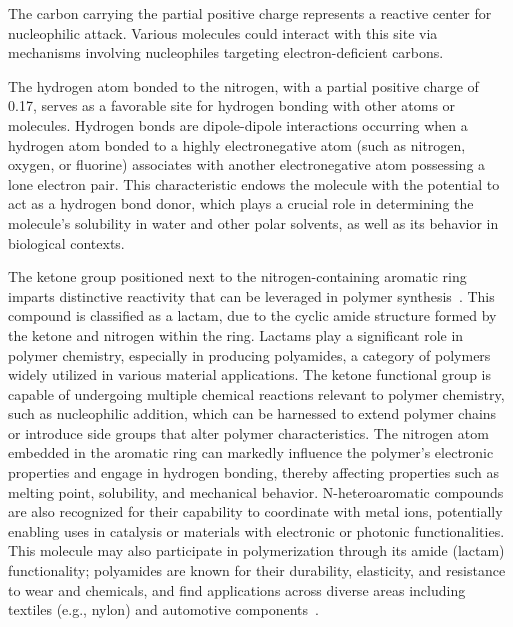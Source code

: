 The carbon carrying the partial positive charge represents a reactive center for nucleophilic attack. Various molecules could interact with this site via mechanisms involving nucleophiles targeting electron-deficient carbons.

The hydrogen atom bonded to the nitrogen, with a partial positive charge of 0.17, serves as a favorable site for hydrogen bonding with other atoms or molecules. Hydrogen bonds are dipole-dipole interactions occurring when a hydrogen atom bonded to a highly electronegative atom (such as nitrogen, oxygen, or fluorine) associates with another electronegative atom possessing a lone electron pair. This characteristic endows the molecule with the potential to act as a hydrogen bond donor, which plays a crucial role in determining the molecule’s solubility in water and other polar solvents, as well as its behavior in biological contexts.

The ketone group positioned next to the nitrogen-containing aromatic ring imparts distinctive reactivity that can be leveraged in polymer synthesis~\cite{McQuarrieSimonPhysicalChemistry,CareySundbergAdvancedOrganicChemistry,Varghese2022BeyondApplications,Varghese2022BeyondApplications}. This compound is classified as a lactam, due to the cyclic amide structure formed by the ketone and nitrogen within the ring. Lactams play a significant role in polymer chemistry, especially in producing polyamides, a category of polymers widely utilized in various material applications. The ketone functional group is capable of undergoing multiple chemical reactions relevant to polymer chemistry, such as nucleophilic addition, which can be harnessed to extend polymer chains or introduce side groups that alter polymer characteristics. The nitrogen atom embedded in the aromatic ring can markedly influence the polymer’s electronic properties and engage in hydrogen bonding, thereby affecting properties such as melting point, solubility, and mechanical behavior. N-heteroaromatic compounds are also recognized for their capability to coordinate with metal ions, potentially enabling uses in catalysis or materials with electronic or photonic functionalities. This molecule may also participate in polymerization through its amide (lactam) functionality; polyamides are known for their durability, elasticity, and resistance to wear and chemicals, and find applications across diverse areas including textiles (e.g., nylon) and automotive components~\cite{Varghese2022BeyondApplications,Varghese2022BeyondApplications}.

